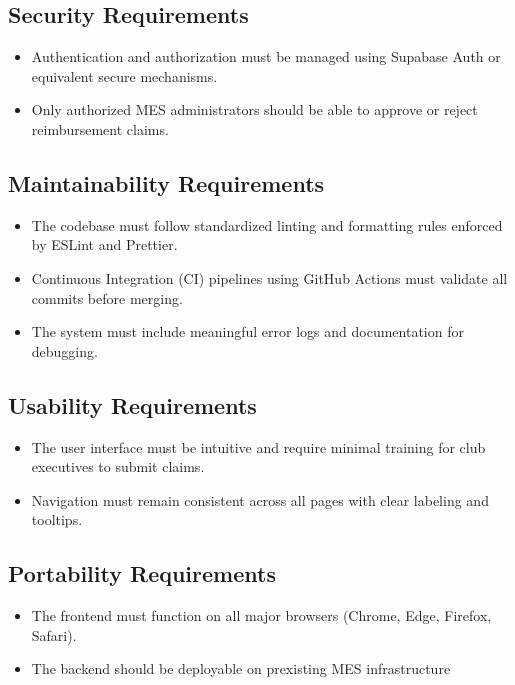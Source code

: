 \documentclass[12pt]{article}
\begin{document}
    \subsection{Security Requirements}
    \begin{itemize}
        \item Authentication and authorization must be managed using Supabase Auth or equivalent secure mechanisms.
        \item Only authorized MES administrators should be able to approve or reject reimbursement claims.
    \end{itemize}

    \subsection{Maintainability Requirements}
    \begin{itemize}
        \item The codebase must follow standardized linting and formatting rules enforced by ESLint and Prettier.
        \item Continuous Integration (CI) pipelines using GitHub Actions must validate all commits before merging.
        \item The system must include meaningful error logs and documentation for debugging.
    \end{itemize}

    \subsection{Usability Requirements}
    \begin{itemize}
        \item The user interface must be intuitive and require minimal training for club executives to submit claims.
        \item Navigation must remain consistent across all pages with clear labeling and tooltips.
    \end{itemize}

    \subsection{Portability Requirements}
    \begin{itemize}
        \item The frontend must function on all major browsers (Chrome, Edge, Firefox, Safari).
        \item The backend should be deployable on prexisting MES infrastructure
    \end{itemize}
\end{document}
